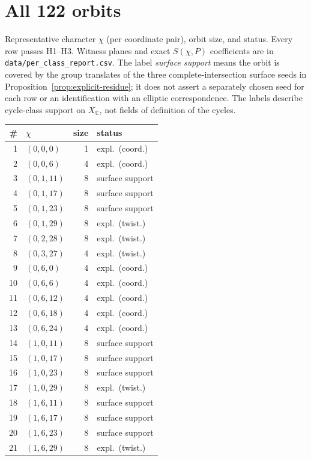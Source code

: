 \documentclass[11pt]{amsart}
\theoremstyle{remark}\newtheorem{remark}[theorem]{Remark}
\begin{document}
\section{All 122 orbits}\label{app:orbits}
Representative character $\chi$ (per coordinate pair), orbit size, and status. Every row passes
H1--H3. Witness planes and exact $S(\chi,P)$ coefficients are in \texttt{data/per\_class\_report.csv}.
The label \emph{surface support} means the orbit is covered by the group translates
of the three complete-intersection surface seeds in Proposition~\ref{prop:explicit-residue};
it does not assert a separately chosen seed for each row or an identification
with an elliptic correspondence. The labels describe cycle-class support on
$X_{\mathbb C}$, not fields of definition of the cycles.
{\small\begin{longtable}{rlrl}\toprule
\# & $\chi$ & size & status\\\midrule\endhead
1 & $(0,0,0)$ & 1 & expl.\ (coord.)\\
2 & $(0,0,6)$ & 4 & expl.\ (coord.)\\
3 & $(0,1,11)$ & 8 & surface support\\
4 & $(0,1,17)$ & 8 & surface support\\
5 & $(0,1,23)$ & 8 & surface support\\
6 & $(0,1,29)$ & 8 & expl.\ (twist.)\\
7 & $(0,2,28)$ & 8 & expl.\ (twist.)\\
8 & $(0,3,27)$ & 4 & expl.\ (twist.)\\
9 & $(0,6,0)$ & 4 & expl.\ (coord.)\\
10 & $(0,6,6)$ & 4 & expl.\ (coord.)\\
11 & $(0,6,12)$ & 4 & expl.\ (coord.)\\
12 & $(0,6,18)$ & 4 & expl.\ (coord.)\\
13 & $(0,6,24)$ & 4 & expl.\ (coord.)\\
14 & $(1,0,11)$ & 8 & surface support\\
15 & $(1,0,17)$ & 8 & surface support\\
16 & $(1,0,23)$ & 8 & surface support\\
17 & $(1,0,29)$ & 8 & expl.\ (twist.)\\
18 & $(1,6,11)$ & 8 & surface support\\
19 & $(1,6,17)$ & 8 & surface support\\
20 & $(1,6,23)$ & 8 & surface support\\
21 & $(1,6,29)$ & 8 & expl.\ (twist.)\\

\end{longtable}}
\end{document}
